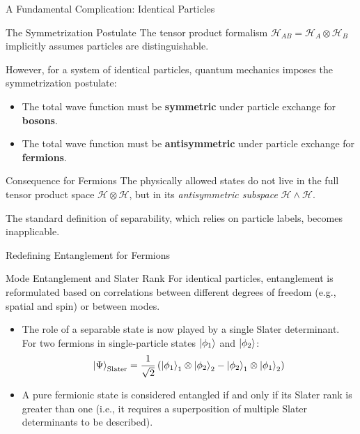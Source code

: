 
\begin{frame}{A Fundamental Complication: Identical Particles}
  \begin{block}{The Symmetrization Postulate}
    The tensor product formalism $\mathcal{H}_{AB} = \mathcal{H}_A \otimes
    \mathcal{H}_B$ implicitly assumes particles are distinguishable.
    \pause

    However, for a system of identical particles, quantum mechanics imposes the
    \alert{symmetrization postulate}:
    \begin{itemize}[<+->]
      \item The total wave function must be \textbf{symmetric} under particle exchange for \textbf{bosons}.
      \item The total wave function must be \textbf{antisymmetric} under particle exchange for \textbf{fermions}.
    \end{itemize}
  \end{block}
\end{frame}

\begin{frame}
  \begin{alertblock}{Consequence for Fermions}
    The physically allowed states do not live in the full tensor product space
    $\mathcal{H} \otimes \mathcal{H}$, but in its \emph{antisymmetric subspace}
    $\mathcal{H} \wedge \mathcal{H}$.

    The standard definition of separability, which relies on particle labels,
    becomes inapplicable.
  \end{alertblock}
\end{frame}


\begin{frame}{Redefining Entanglement for Fermions}
  \begin{block}{Mode Entanglement and Slater Rank}
    For identical particles, entanglement is reformulated based on correlations
    between different degrees of freedom (e.g., spatial and spin) or between
    modes.
    \pause
    \begin{itemize}
      \item The role of a separable state is now played by a single
        \alert{Slater determinant}. For two fermions in single-particle states
        $\ket{\phi_1}$ and $\ket{\phi_2}$:
        \[
          \ket{\Psi}_{\text{Slater}} = \frac{1}{\sqrt{2}}
          \left( \ket{\phi_1}_1 \otimes \ket{\phi_2}_2 -
          \ket{\phi_2}_1 \otimes \ket{\phi_1}_2 \right)
        \]
        \pause
      \item A pure fermionic state is considered \alert{entangled if and only if
        its Slater rank is greater than one} (i.e., it requires a superposition
        of multiple Slater determinants to be described).
    \end{itemize}
  \end{block}
\end{frame}

